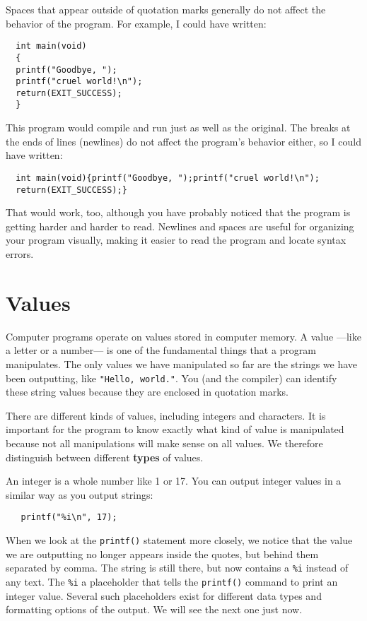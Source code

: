 Spaces that appear outside of quotation marks generally do
not affect the behavior of the program.  For example, I
could have written:

\begin{verbatim}
  int main(void)
  {
  printf("Goodbye, ");
  printf("cruel world!\n");	     
  return(EXIT_SUCCESS);
  }
\end{verbatim}
%
This program would compile and run just as well as the original.
The breaks at the ends of lines (newlines) do not affect
the program's behavior either, so I could have written:

\begin{verbatim}
  int main(void){printf("Goodbye, ");printf("cruel world!\n");
  return(EXIT_SUCCESS);}
\end{verbatim}
%
That would work, too, although you have probably noticed that
the program is getting harder and harder to read.  Newlines and
spaces are useful for organizing your program visually, making
it easier to read the program and locate syntax errors.

\section{Values}

Computer programs operate on values stored in 
computer memory.
A value ---like a letter or
a number--- is one of the fundamental things that a program manipulates.  
The only values we have
manipulated so far are the strings we have been outputting, like
{\tt "Hello, world."}.  You (and the compiler) can identify
these string values because they are enclosed in quotation marks.

There are different kinds of values, including integers and characters.
It is important for the program to know exactly what kind of value
is manipulated because not all manipulations will make sense on all
values.
We therefore distinguish between different {\bf types} of values.  

An integer is a whole number like 1 or 17.  You can output
integer values in a similar way as you output strings:

\begin{verbatim}
   printf("%i\n", 17);
\end{verbatim}
%
When we look at the \texttt{printf()} statement more closely, we
notice that the value we are outputting no longer appears
inside the quotes, but behind them separated by comma.
The string is still there, but now contains a {\tt \%i} instead of
any text. 
The {\tt \%i} a placeholder that tells the \texttt{printf()} command
to print an integer value. Several such placeholders exist
for different data types and formatting options of the output.
We will see the next one just now.


